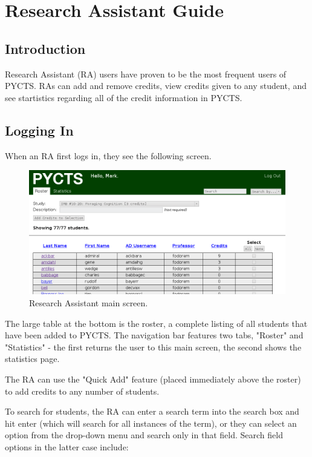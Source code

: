 \documentclass[letterpaper,titlepage]{article}
\begin{document}
\newpage

\section{Research Assistant Guide}
\label{sec:ra_guide}
\subsection{Introduction}
Research Assistant (RA) users have proven to be the most frequent users of PYCTS. RAs can add and remove credits, view credits given to any student, and see startistics regarding all of the credit information in PYCTS.

\subsection{Logging In}
When an RA first logs in, they see the following screen.

\begin{figure}[H]
\includegraphics[width=\textwidth]{images/ra_main-screen.png}
\caption{Research Assistant main screen.}
\label{ra_main-screen}
\end{figure}

The large table at the bottom is the roster, a complete listing of all students that have been added to PYCTS. The navigation bar features two tabs, "Roster" and "Statistics" - the first returns the user to this main screen, the second shows the statistics page. 

The RA can use the "Quick Add" feature (placed immediately above the roster) to add credits to any number of students.

To search for students, the RA can enter a search term into the search box and hit enter (which will search for all instances of the term), or they can select an option from the drop-down menu and search only in that field. Search field options in the latter case include:
\end{document}
